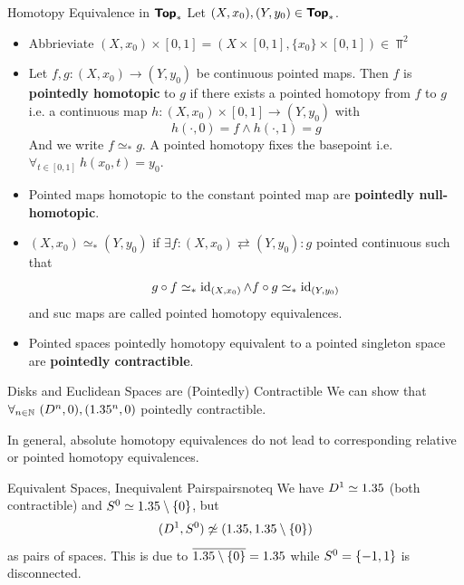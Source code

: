 \begin{definition}{Homotopy Equivalence in $\bm{\mathsf{Top}}_*$}{}
  Let $(X,x_0),(Y,y_0)\in\bm{\mathsf{Top}}_*$. \begin{itemize}
    \item Abbrieviate $(X,x_0)\times[0,1]=(X\times [0,1], \{x_0\}\times [0,1])\in\Top^2$
    \item Let $f,g:(X,x_0)\to(Y,y_0)$ be continuous pointed maps. Then $f$ is \textbf{pointedly homotopic} to $g$ if there exists a pointed homotopy from $f$ to $g$ i.e. a continuous map $h:(X,x_0)\times[0,1]\to(Y,y_0)$ with \[
      h(\cdot,0)=f\land h(\cdot,1)=g
    \]
    And we write $f\simeq_*g$. A pointed homotopy fixes the basepoint i.e. $\forall_{t\in[0,1]} \ h(x_0,t)=y_0$.
    \item Pointed maps homotopic to the constant pointed map are \textbf{pointedly null-homotopic}.
    \item $(X,x_0)\simeq_* (Y,y_0)$ if $\exists f:(X,x_0)\rightleftarrows(Y,y_0):g$ pointed continuous such that \[
      g\circ f\simeq_* \operatorname{id}_{(X,x_0)} \land f\circ g\simeq_* \operatorname{id}_{(Y,y_0)}
    \]
    and suc maps are called pointed homotopy equivalences.
    \item Pointed spaces pointedly homotopy equivalent to a pointed singleton space are \textbf{pointedly contractible}.
  \end{itemize}
\end{definition}

\begin{example}{Disks and Euclidean Spaces are (Pointedly) Contractible}{}
  We can show that $\forall_{n\in\N} \ (D^n,0),(\R^n,0)$ pointedly contractible. 
\end{example}

\newpage

In general, absolute homotopy equivalences do not lead to corresponding relative or pointed homotopy equivalences.

\begin{example}{Equivalent Spaces, Inequivalent Pairs}{pairsnoteq}
  We have $D^{1}\simeq1.35$ (both contractible) and $S^{0}\simeq1.35\setminus\{0\}$, but \[
    (D^{1},S^{0})\not\simeq(1.35,1.35\setminus\{0\})
  \]
  as pairs of spaces. This is due to $\overline{1.35\setminus\{0\}}=1.35$ while $S^{0}=\{-1,1\}$ is disconnected.
\end{example}

